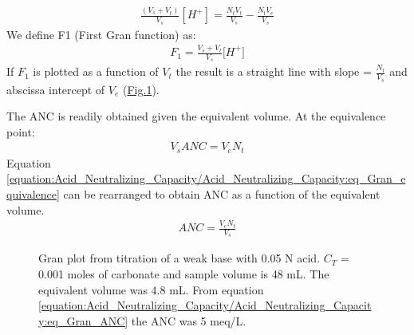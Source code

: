 \documentclass[letterpaper,10pt,english]{sphinxmanual}
\let\sphinxpxdimen\pdfpxdimen\else\newdimen\sphinxpxdimen
\begin{document}
\begin{equation}\label{equation:Acid_Neutralizing_Capacity/Acid_Neutralizing_Capacity:Acid_Neutralizing_Capacity/Acid_Neutralizing_Capacity:1}
\begin{split}\frac{\left(V_{s} +V_{t} \right)}{V_{s} } \left[H^{+} \right]=\frac{N_{t} V_{t} }{V_{s} } -\frac{N_{t} V_{e} }{V_{s} }\end{split}
\end{equation}
We define F1 (First Gran function) as:
\begin{equation}\label{equation:Acid_Neutralizing_Capacity/Acid_Neutralizing_Capacity:eq_Gran_F1}
\begin{split}F_{1} = \frac{V_{s} +V_{t} }{V_{s} } {[H}^{+} {]}\end{split}
\end{equation}
If \(F_1\) is plotted as a function of \(V_t\) the result is a straight line with slope = \(\frac{N_{t} }{V_{s} }\) and abscissa intercept of \(V_e\) (\hyperref[\detokenize{Acid_Neutralizing_Capacity/Acid_Neutralizing_Capacity:figure-gran-plot}]{Fig.\@ \ref{\detokenize{Acid_Neutralizing_Capacity/Acid_Neutralizing_Capacity:figure-gran-plot}}}).

The ANC is readily obtained given the equivalent volume. At the equivalence point:
\begin{equation}\label{equation:Acid_Neutralizing_Capacity/Acid_Neutralizing_Capacity:eq_Gran_equivalence}
\begin{split}V_s ANC= V_e N_t\end{split}
\end{equation}
Equation \eqref{equation:Acid_Neutralizing_Capacity/Acid_Neutralizing_Capacity:eq_Gran_equivalence} can be rearranged to obtain ANC as a function of the equivalent volume.
\begin{equation}\label{equation:Acid_Neutralizing_Capacity/Acid_Neutralizing_Capacity:eq_Gran_ANC}
\begin{split}ANC=\frac{V_e N_t }{V_s }\end{split}
\end{equation}
\begin{figure}[htbp]
\centering
\capstart

\noindent\sphinxincludegraphics[width=300\sphinxpxdimen]{{Gran_plot}.png}
\caption{Gran plot from titration of a weak base with 0.05 N acid. \(C_T\) = 0.001 moles of carbonate and sample volume is 48 mL. The equivalent volume was 4.8 mL. From equation  \eqref{equation:Acid_Neutralizing_Capacity/Acid_Neutralizing_Capacity:eq_Gran_ANC} the ANC was 5 meq/L.}\label{\detokenize{Acid_Neutralizing_Capacity/Acid_Neutralizing_Capacity:id1}}\label{\detokenize{Acid_Neutralizing_Capacity/Acid_Neutralizing_Capacity:figure-gran-plot}}\end{figure}
\end{document}
